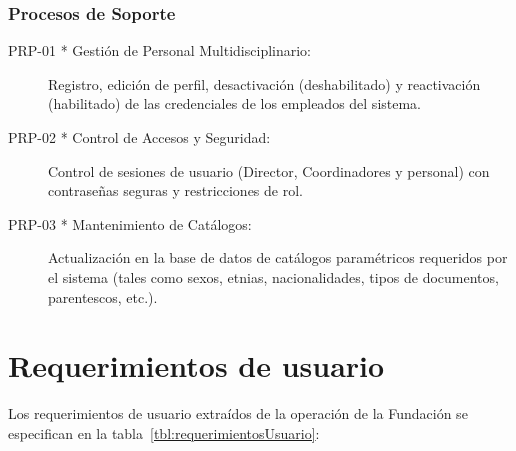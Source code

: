\subsubsection{Procesos de Soporte}
\begin{description}
	\item[PRP-01 * Gestión de Personal Multidisciplinario:] Registro, edición de perfil, desactivación (deshabilitado) y reactivación (habilitado) de las credenciales de los empleados del sistema.
	\item[PRP-02 * Control de Accesos y Seguridad:] Control de sesiones de usuario (Director, Coordinadores y personal) con contraseñas seguras y restricciones de rol.
	\item[PRP-03 * Mantenimiento de Catálogos:] Actualización en la base de datos de catálogos paramétricos requeridos por el sistema (tales como sexos, etnias, nacionalidades, tipos de documentos, parentescos, etc.).
\end{description}


\section{Requerimientos de usuario}

Los requerimientos de usuario extraídos de la operación de la Fundación se especifican en la tabla~\ref{tbl:requerimientosUsuario}:


